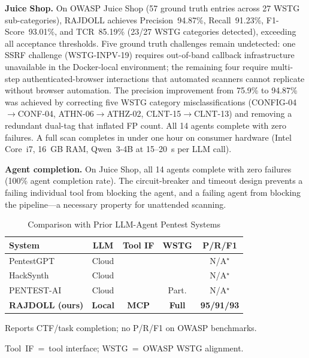 \documentclass[conference]{IEEEtran}
\newcommand{\xmark}{\ding{55}}
\begin{document}
\textbf{Juice Shop.}
On OWASP Juice Shop (57 ground truth entries across 27 WSTG
sub-categories), RAJDOLL achieves Precision~94.87\%, Recall~91.23\%,
F1-Score~93.01\%, and TCR~85.19\% (23/27 WSTG categories detected),
exceeding all acceptance thresholds. Five ground truth challenges
remain undetected: one SSRF challenge (WSTG-INPV-19) requires
out-of-band callback infrastructure unavailable in the Docker-local
environment; the remaining four require multi-step authenticated-browser
interactions that automated scanners cannot replicate without browser
automation. The precision improvement from 75.9\% to 94.87\% was
achieved by correcting five WSTG category misclassifications
(CONFIG-04$\to$CONF-04, ATHN-06$\to$ATHZ-02, CLNT-15$\to$CLNT-13)
and removing a redundant dual-tag that inflated FP count. All 14 agents
complete with zero failures. A full scan completes in under one hour on
consumer hardware (Intel Core~i7, 16~GB RAM, Qwen~3-4B at
15--20~s per LLM call).

\textbf{Agent completion.}
On Juice Shop, all 14 agents complete with zero failures
(100\% agent completion rate). The circuit-breaker and timeout
design prevents a failing individual tool from blocking the agent,
and a failing agent from blocking the pipeline---a necessary property
for unattended scanning.

\begin{table}[!t]
\caption{Comparison with Prior LLM-Agent Pentest Systems}
\label{tab:comparison}
\centering
\small
\begin{threeparttable}
\begin{tabular}{lcccc}
\toprule
\textbf{System} & \textbf{LLM} & \textbf{Tool IF} & \textbf{WSTG} & \textbf{P/R/F1} \\
\midrule
PentestGPT~\cite{pentestgpt}  & Cloud & \xmark & \xmark & N/A$^\star$ \\
HackSynth~\cite{hacksynth}    & Cloud & \xmark & \xmark & N/A$^\star$ \\
PENTEST-AI~\cite{pentestai}   & Cloud & \xmark & Part. & N/A$^\star$ \\
\textbf{RAJDOLL (ours)}       & \textbf{Local} & \textbf{MCP} & \textbf{Full} & \textbf{95/91/93} \\
\bottomrule
\end{tabular}
\begin{tablenotes}
  \footnotesize
  \item[$^\star$] Reports CTF/task completion; no P/R/F1 on OWASP benchmarks.
  \item Tool~IF~=~tool interface; WSTG~=~OWASP WSTG alignment.
\end{tablenotes}
\end{threeparttable}
\end{table}
\end{document}
